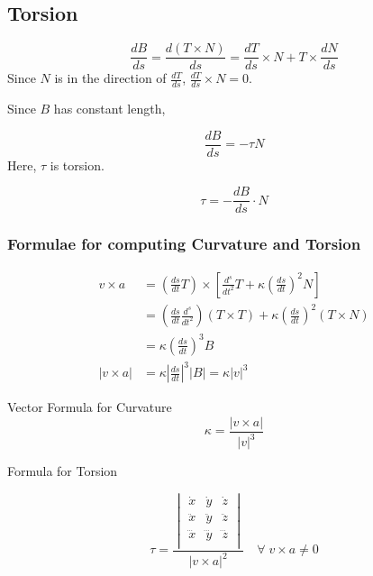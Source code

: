 \documentclass[12pt]{article}
\theoremstyle{definition}
\begin{document}
\subsection{Torsion}

\begin{equation*}
	\frac{dB}{ds} = \frac{d(T \times N)}{ds} = \frac{dT}{ds} \times N + T \times \frac{dN}{ds}
\end{equation*}
Since $N$ is in the direction of $\frac{dT}{ds}$, $\frac{dT}{ds} \times N = 0$.

Since $B$ has constant length, 

\begin{equation*}
	\frac{dB}{ds} = - \tau N
\end{equation*}
Here, $\tau$ is torsion.

\begin{equation*}
	\tau = -\frac{dB}{ds} \cdot N
\end{equation*}

\subsubsection{Formulae for computing Curvature and Torsion}

\begin{align*}
	v \times a &= \left( \frac{ds}{dt} T \right) \times \left[ \frac{d^s}{dt^2}T + \kappa \left( \frac{ds}{dt} \right)^2 N \right] \\
	&=  \left( \frac{ds}{dt} \frac{d^s}{dt^2} \right) \left( T \times T \right) + \kappa \left( \frac{ds}{dt} \right) ^2 \left( T \times N \right) \\
	&=  \kappa \left( \frac{ds}{dt} \right)^3 B \\
	\left| v \times a \right| &=  \kappa \left| \frac{ds}{dt} \right| ^3 \left| B \right| = \kappa \left| v \right|^3
\end{align*}

Vector Formula for Curvature
\begin{equation*}
	\kappa = \frac{ \left| v \times a \right| }{ \left| v \right|^3 }
\end{equation*}

Formula for Torsion

\begin{equation*}
	\tau = \frac{ \begin{vmatrix}
			\dot{x} & \dot{y} & \dot{z} \\
			\ddot{x} & \ddot{y} & \ddot{z} \\
			\dddot{x} & \dddot{y} & \dddot{z} \\
	\end{vmatrix} }{ \left| v \times a \right|^2 } \quad \forall\; v \times a \neq 0
\end{equation*}
\end{document}
